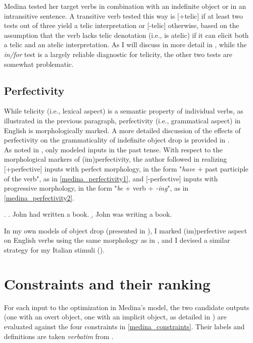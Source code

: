 Medina tested her target verbs in combination with an indefinite object or in an intransitive sentence. A transitive verb tested this way is [+telic] if at least two tests out of three yield a telic interpretation or [-telic] otherwise, based on the assumption that the verb lacks telic denotation (i.e., is atelic) if it can elicit both a telic and an atelic interpretation. As I will discuss in more detail in , while the \textit{in/for} test is a largely reliable diagnostic for telicity, the other two tests are somewhat problematic.


\subsection{Perfectivity} While telicity (i.e., lexical aspect) is a semantic property of individual verbs, as illustrated in the previous paragraph, perfectivity (i.e., grammatical aspect) in English is morphologically marked. A more detailed discussion of the effects of perfectivity on the grammaticality of indefinite object drop is provided in .\\
As noted in , \textcite{Medina2007} only modeled inputs in the past tense. With respect to the morphological markers of (im)perfectivity, the author followed \textcite{Olsen1997} in realizing [+perfective] inputs with perfect morphology, in the form "\textit{have} + past participle of the verb", as in \ref{medina_perfectivity1}, and [-perfective] inputs with progressive morphology, in the form "\textit{be} + verb + \textit{-ing}", as in \ref{medina_perfectivity2}.

\ex. \label{medina_perfectivity} \a. \label{medina_perfectivity1} John had written a book.
\b. \label{medina_perfectivity2}  John was writing a book.

In my own models of object drop (presented in ), I marked (im)perfective aspect on English verbs using the same morphology as in \textcite{Medina2007}, and I devised a similar strategy for my Italian stimuli ().


\section{Constraints and their ranking} 

For each input to the optimization in Medina's model, the two candidate outputs (one with an overt object, one with an implicit object, as detailed in ) are evaluated against the four constraints in \ref{medina_constraints}. Their labels and definitions are taken \textit{verbatim} from \textcite[72]{Medina2007}.

